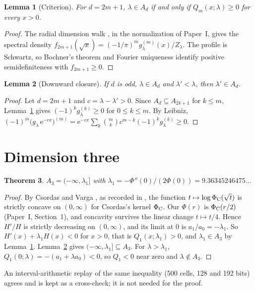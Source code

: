 \documentclass[11pt]{article}
\newtheorem{theorem}{Theorem}
\newtheorem{lemma}[theorem]{Lemma}
\theoremstyle{remark}
\newcommand{\ee}{\mathrm{e}}
\begin{document}
\begin{lemma}[Criterion]\label{lem:crit}
For $d=2m+1$, $\lambda\in A_d$ if and only if $Q_m(x;\lambda)\ge0$ for every $x>0$.
\end{lemma}
\begin{proof}
The radial dimension walk \cite{GT}, in the normalization of Paper~I, gives the spectral density
$f_{2m+1}(\sqrt{x})=(-1/\pi)^m g_\lambda^{(m)}(x)/Z_\lambda$. The profile is Schwartz, so Bochner's
theorem and Fourier uniqueness identify positive semidefiniteness with $f_{2m+1}\ge0$.
\end{proof}

\begin{lemma}[Downward closure]\label{lem:down}
If $d$ is odd, $\lambda\in A_d$ and $\lambda'<\lambda$, then $\lambda'\in A_d$.
\end{lemma}
\begin{proof}
Let $d=2m+1$ and $c=\lambda-\lambda'>0$. Since $A_d\subseteq A_{2k+1}$ for $k\le m$,
Lemma~\ref{lem:crit} gives $(-1)^k g_\lambda^{(k)}\ge0$ for $0\le k\le m$. By Leibniz,
$(-1)^m\bigl(g_\lambda\,\ee^{-cx}\bigr)^{(m)}=\ee^{-cx}\sum_k\binom{m}{k}c^{m-k}(-1)^kg_\lambda^{(k)}\ge0$.
\end{proof}

\section{Dimension three}
\begin{theorem}\label{thm:d3}
$A_3=(-\infty,\lambda_1]$ with $\lambda_1=-\Phi''(0)/(2\Phi(0))=9.36345246475\ldots$
\end{theorem}
\begin{proof}
By Csordas and Varga \cite{CV88}, as recorded in \cite[Theorem 2.2(b)]{Csordas98}, the function
$t\mapsto\log\Phi_{\rm C}(\sqrt{t})$ is strictly concave on $(0,\infty)$ for Csordas's kernel
$\Phi_{\rm C}$. Our $\Phi(r)$ is $\Phi_{\rm C}(r/2)$ (Paper~I, Section~1), and concavity survives
the linear change $t\mapsto t/4$. Hence $H'/H$ is strictly decreasing on $(0,\infty)$, and its
limit at $0$ is $a_1/a_0=-\lambda_1$. So $H'(x)+\lambda_1H(x)<0$ for $x>0$, that is
$Q_1(x;\lambda_1)>0$, and $\lambda_1\in A_3$ by Lemma~\ref{lem:crit}. Lemma~\ref{lem:down} gives
$(-\infty,\lambda_1]\subseteq A_3$. For $\lambda>\lambda_1$, $Q_1(0;\lambda)=-(a_1+\lambda a_0)<0$,
so $Q_1<0$ near zero and $\lambda\notin A_3$.
\end{proof}
An interval-arithmetic replay of the same inequality (500 cells, 128 and 192 bits) agrees and is
kept as a cross-check; it is not needed for the proof.
\end{document}
